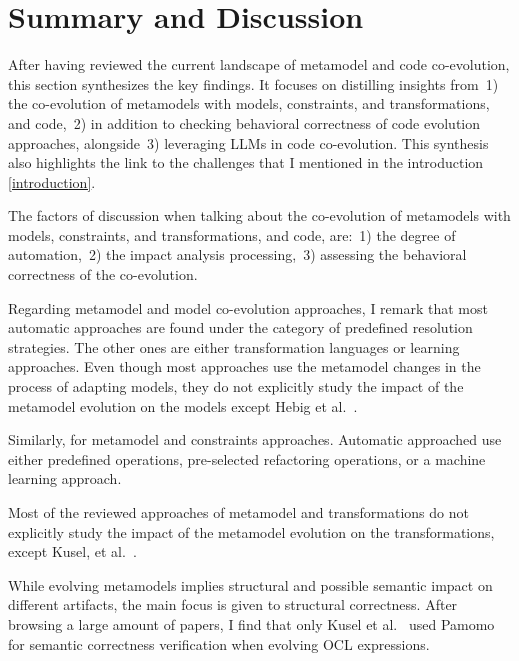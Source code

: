   \section{Summary and Discussion}
 \label{sotadiscuss}
  After having reviewed the current landscape of metamodel and code co-evolution, this section synthesizes the key findings. It focuses on distilling insights from~1) the co-evolution of metamodels with models, constraints, and transformations, and code,~2) in addition to checking behavioral correctness of code evolution approaches, alongside~3) leveraging LLMs in code co-evolution. This synthesis also highlights the link to the challenges that I mentioned in the introduction \ref{introduction}.
  
  The factors of discussion when talking about the co-evolution of metamodels with models, constraints, and transformations, and code, are:~1) the degree of automation,~2) the impact analysis processing,~3) assessing the behavioral correctness of the co-evolution.
  
  Regarding metamodel and model co-evolution approaches, I remark that most automatic approaches are found under the category of predefined resolution strategies. The other ones are either transformation languages or learning approaches. Even though most approaches use the metamodel changes in the process of adapting models, they do not explicitly study the impact of the metamodel evolution on the models except Hebig et al.~\cite{hebig2016approaches}.
  
  Similarly, for metamodel and constraints approaches.
  Automatic approached use either predefined operations, pre-selected refactoring operations, or a machine learning approach.
  
 
  Most of the reviewed approaches of metamodel and transformations do not explicitly study the impact of the metamodel evolution on the transformations, except Kusel, et al.~\cite{kusel2015consistent}.
  
  While evolving metamodels implies structural and possible semantic impact on different artifacts, the main focus is given to structural correctness. After browsing a large amount of papers, I find that only Kusel et al.~\cite{kusel2015systematic} used Pamomo~\cite{10.1007/s10515-012-0102-y} for semantic correctness verification when evolving OCL expressions.
  
